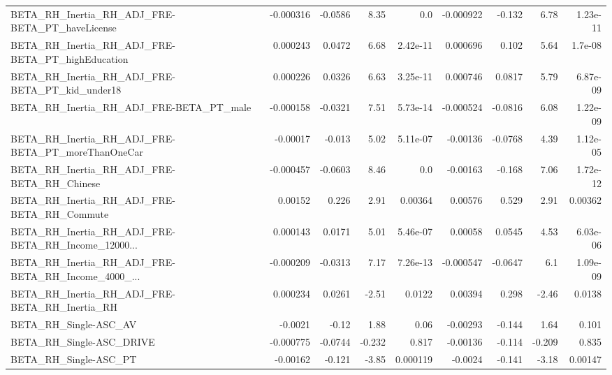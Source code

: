 \begin{tabular}{lrrrrrrrr}
BETA\_RH\_Inertia\_RH\_ADJ\_FRE-BETA\_PT\_haveLicense     &   -0.000316 &      -0.0586 &     8.35 &      0.0 &  -0.000922 &      -0.132 &         6.78 &      1.23e-11 \\
BETA\_RH\_Inertia\_RH\_ADJ\_FRE-BETA\_PT\_highEducation   &    0.000243 &       0.0472 &     6.68 & 2.42e-11 &   0.000696 &       0.102 &         5.64 &       1.7e-08 \\
BETA\_RH\_Inertia\_RH\_ADJ\_FRE-BETA\_PT\_kid\_under18     &    0.000226 &       0.0326 &     6.63 & 3.25e-11 &   0.000746 &      0.0817 &         5.79 &      6.87e-09 \\
BETA\_RH\_Inertia\_RH\_ADJ\_FRE-BETA\_PT\_male            &   -0.000158 &      -0.0321 &     7.51 & 5.73e-14 &  -0.000524 &     -0.0816 &         6.08 &      1.22e-09 \\
BETA\_RH\_Inertia\_RH\_ADJ\_FRE-BETA\_PT\_moreThanOneCar  &    -0.00017 &       -0.013 &     5.02 & 5.11e-07 &   -0.00136 &     -0.0768 &         4.39 &      1.12e-05 \\
BETA\_RH\_Inertia\_RH\_ADJ\_FRE-BETA\_RH\_Chinese         &   -0.000457 &      -0.0603 &     8.46 &      0.0 &   -0.00163 &      -0.168 &         7.06 &      1.72e-12 \\
BETA\_RH\_Inertia\_RH\_ADJ\_FRE-BETA\_RH\_Commute         &     0.00152 &        0.226 &     2.91 &  0.00364 &    0.00576 &       0.529 &         2.91 &       0.00362 \\
BETA\_RH\_Inertia\_RH\_ADJ\_FRE-BETA\_RH\_Income\_12000... &    0.000143 &       0.0171 &     5.01 & 5.46e-07 &    0.00058 &      0.0545 &         4.53 &      6.03e-06 \\
BETA\_RH\_Inertia\_RH\_ADJ\_FRE-BETA\_RH\_Income\_4000\_... &   -0.000209 &      -0.0313 &     7.17 & 7.26e-13 &  -0.000547 &     -0.0647 &          6.1 &      1.09e-09 \\
BETA\_RH\_Inertia\_RH\_ADJ\_FRE-BETA\_RH\_Inertia\_RH      &    0.000234 &       0.0261 &    -2.51 &   0.0122 &    0.00394 &       0.298 &        -2.46 &        0.0138 \\
BETA\_RH\_Single-ASC\_AV                              &     -0.0021 &        -0.12 &     1.88 &     0.06 &   -0.00293 &      -0.144 &         1.64 &         0.101 \\
BETA\_RH\_Single-ASC\_DRIVE                           &   -0.000775 &      -0.0744 &   -0.232 &    0.817 &   -0.00136 &      -0.114 &       -0.209 &         0.835 \\
BETA\_RH\_Single-ASC\_PT                              &    -0.00162 &       -0.121 &    -3.85 & 0.000119 &    -0.0024 &      -0.141 &        -3.18 &       0.00147 \\

\end{tabular}
